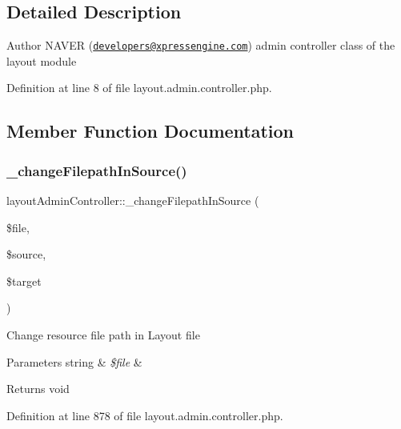 \subsection{Detailed Description}
\begin{DoxyAuthor}{Author}
N\+A\+V\+ER (\href{mailto:developers@xpressengine.com}{\tt developers@xpressengine.\+com}) admin controller class of the layout module 
\end{DoxyAuthor}


Definition at line 8 of file layout.\+admin.\+controller.\+php.



\subsection{Member Function Documentation}
\mbox{\label{classlayoutAdminController_a9dd8cb93d56db698fd6426a11dad6056}} 
\subsubsection{\texorpdfstring{\+\_\+change\+Filepath\+In\+Source()}{\_changeFilepathInSource()}}
{\footnotesize\ttfamily layout\+Admin\+Controller\+::\+\_\+change\+Filepath\+In\+Source (\begin{DoxyParamCaption}\item[{}]{\$file,  }\item[{}]{\$source,  }\item[{}]{\$target }\end{DoxyParamCaption})}

Change resource file path in Layout file 
\begin{DoxyParams}[1]{Parameters}
string & {\em \$file} & \\
\hline
\end{DoxyParams}
\begin{DoxyReturn}{Returns}
void 
\end{DoxyReturn}


Definition at line 878 of file layout.\+admin.\+controller.\+php.

\mbox{\label{classlayoutAdminController_a0663f5b179989279c5c73a3badd12c1c}} 
